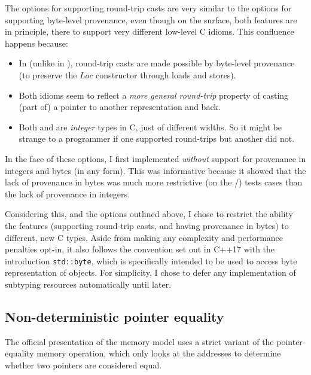 The options for supporting round-trip casts are very similar to the options for
supporting byte-level provenance, even though on the surface, both features are
in principle, there to support very different low-level C idioms. This confluence
happens because:
\begin{itemize}
    \item In  (unlike in ), round-trip casts are made
        possible by byte-level provenance (to preserve the $\mathit{Loc}$
        constructor through loads and stores).
    \item Both idioms seem to reflect a \emph{more general round-trip} property
        of casting (part of) a pointer to another representation and back.
    \item Both  and  are \emph{integer} types in
        C, just of different widths. So it might be strange to a programmer if
        one supported round-trips but another did not.
\end{itemize}

In the face of these options, I first implemented  \emph{without}
support for provenance in integers and bytes (in any form). This was
informative because it showed that the lack of provenance in bytes was much
more restrictive (on the /) tests cases than the lack
of provenance in integers.

Considering this, and the options outlined above, I chose to restrict the
ability the features (supporting round-trip casts, and having provenance in
bytes) to different, new C types. Aside from making any complexity and
performance penalties opt-in, it also follows the convention set out in C++17
with the introduction \texttt{std::byte}, which is specifically
intended to be used to access byte representation of objects. For simplicity, I
chose to defer any implementation of subtyping resources automatically until
later.

\subsection{Non-deterministic pointer equality}

The official presentation of the  memory model uses a strict variant of
the pointer-equality memory operation, which only looks at the addresses to
determine whether two pointers are considered equal.

